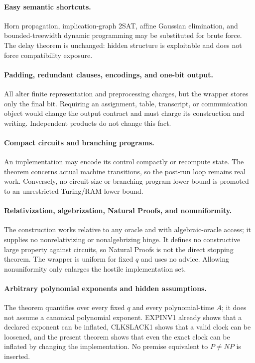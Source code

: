 \documentclass[11pt]{article}
\begin{document}
\paragraph{Easy semantic shortcuts.}
Horn propagation, implication-graph $2$SAT, affine Gaussian elimination, and
bounded-treewidth dynamic programming may be substituted for brute force.
The delay theorem is unchanged: hidden structure is exploitable and does not
force compatibility exposure.

\paragraph{Padding, redundant clauses, encodings, and one-bit output.}
All alter finite representation and preprocessing charges, but the wrapper
stores only the final bit.  Requiring an assignment, table, transcript, or
communication object would change the output contract and must charge its
construction and writing.  Independent products do not change this fact.

\paragraph{Compact circuits and branching programs.}
An implementation may encode its control compactly or recompute state.
The theorem concerns actual machine transitions, so the post-run loop remains
real work.  Conversely, no circuit-size or branching-program lower bound is
promoted to an unrestricted Turing/RAM lower bound.

\paragraph{Relativization, algebrization, Natural Proofs, and nonuniformity.}
The construction works relative to any oracle and with algebraic-oracle
access; it supplies no nonrelativizing or nonalgebrizing hinge.  It defines no
constructive large property against circuits, so Natural Proofs is not the
direct stopping theorem.  The wrapper is uniform for fixed $q$ and uses no
advice.  Allowing nonuniformity only enlarges the hostile implementation set.

\paragraph{Arbitrary polynomial exponents and hidden assumptions.}
The theorem quantifies over every fixed $q$ and every polynomial-time $A$;
it does not assume a canonical polynomial exponent.  EXPINV1 already shows
that a declared exponent can be inflated, CLKSLACK1 shows that a valid clock
can be loosened, and the present theorem shows that even the exact clock can
be inflated by changing the implementation.  No premise equivalent to
$P\ne NP$ is inserted.
\end{document}
